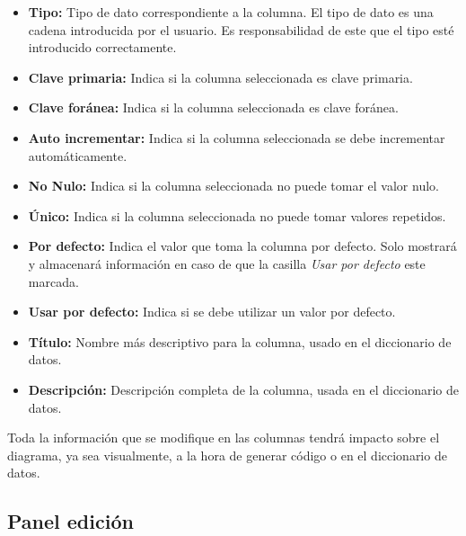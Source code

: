 \begin{itemize}
    \item \textbf{Tipo: }Tipo de dato correspondiente a la columna. El tipo de dato es una cadena introducida por el usuario. Es responsabilidad de este que el tipo esté introducido correctamente.
    \item \textbf{Clave primaria: }Indica si la columna seleccionada es clave primaria.
    \item \textbf{Clave foránea: }Indica si la columna seleccionada es clave foránea.
    \item \textbf{Auto incrementar: }Indica si la columna seleccionada se debe incrementar automáticamente.
    \item \textbf{No Nulo: }Indica si la columna seleccionada no puede tomar el valor nulo.
    \item \textbf{Único: }Indica si la columna seleccionada no puede tomar valores repetidos.
    \item \textbf{Por defecto: }Indica el valor que toma la columna por defecto. Solo mostrará y almacenará información en caso de que la casilla \textit{Usar por defecto} este marcada.
    \item \textbf{Usar por defecto: }Indica si se debe utilizar un valor por defecto.
    \item \textbf{Título: }Nombre más descriptivo para la columna, usado en el diccionario de datos.
    \item \textbf{Descripción: }Descripción completa de la columna, usada en el diccionario de datos.
\end{itemize}

Toda la información que se modifique en las columnas tendrá impacto sobre el diagrama, ya sea visualmente, a la hora de generar código o en el diccionario de datos.

\subsection{Panel edición}


